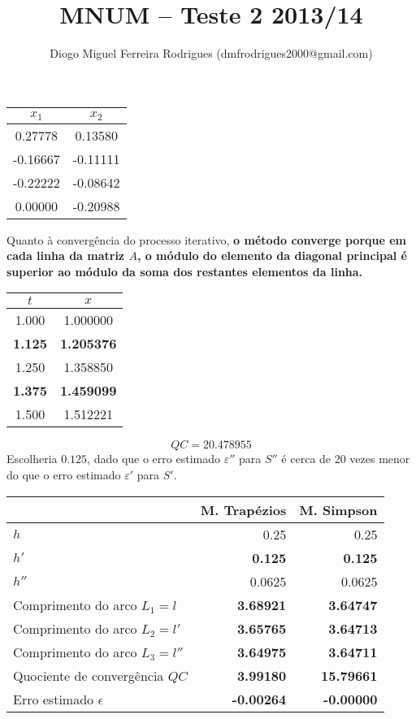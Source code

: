 \documentclass{mnum}
\title{MNUM -- Teste 2 2013/14}
\author{Diogo Miguel Ferreira Rodrigues (dmfrodrigues2000@gmail.com)}
\begin{document}
\setcounter{chapter}{12}


\begin{center} \begin{tabular}{c | c}
	$x_1$ & $x_2$ \\ \hline
	0.27778  &      0.13580 \\
	-0.16667 &      -0.11111 \\
	-0.22222 &      -0.08642 \\
	0.00000  &      -0.20988
\end{tabular} \end{center}
Quanto à convergência do processo iterativo, \textbf{o método converge porque em cada linha da matriz $A$, o módulo do elemento da diagonal principal é superior ao módulo da soma dos restantes elementos da linha.}


\begin{center} \begin{tabular}{c | c}
	$t$ & $x$ \\ \hline
	1.000 & 1.000000 \\
	\textbf{1.125} & \textbf{1.205376} \\
	1.250 & 1.358850 \\
	\textbf{1.375} & \textbf{1.459099} \\
	1.500 & 1.512221
\end{tabular} \end{center}
\begin{equation*}
	QC=20.478955
\end{equation*}
Escolheria $0.125$, dado que o erro estimado $\varepsilon''$ para $S''$ é cerca de 20 vezes menor do que o erro estimado $\varepsilon'$ para $S'$.


\begin{center} \begin{tabular}{l | r r}
	& M. Trapézios & M. Simpson \\ \hline
	$h$ & 0.25 & 0.25 \\
	$h'$ & \textbf{0.125} & \textbf{0.125} \\
	$h''$ & 0.0625 & 0.0625 \\
	Comprimento do arco $L_1=l  $  & \textbf{3.68921} & \textbf{3.64747} \\
	Comprimento do arco $L_2=l' $  & \textbf{3.65765} & \textbf{3.64713} \\
	Comprimento do arco $L_3=l''$  & \textbf{3.64975} & \textbf{3.64711} \\
	Quociente de convergência $QC$ & \textbf{3.99180} & \textbf{15.79661} \\
	Erro estimado $\epsilon$       & \textbf{-0.00264} & \textbf{-0.00000}
\end{tabular} \end{center}
\end{document}
